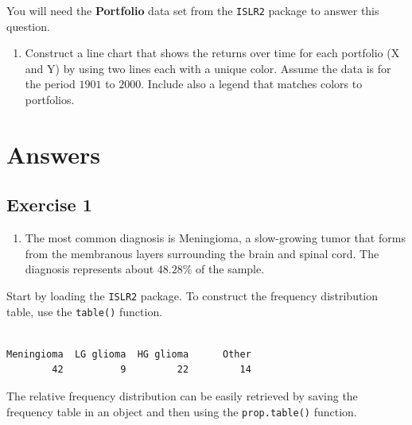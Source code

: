 \documentclass[
  letterpaper,
  DIV=11,
  numbers=noendperiod]{scrreprt}
\newenvironment{Shaded}{\begin{snugshade}}{\end{snugshade}}
\newcommand{\FunctionTok}[1]{\textcolor[rgb]{0.28,0.35,0.67}{#1}}
\newcommand{\NormalTok}[1]{\textcolor[rgb]{0.00,0.23,0.31}{#1}}
\newcommand{\SpecialCharTok}[1]{\textcolor[rgb]{0.37,0.37,0.37}{#1}}
\providecommand{\tightlist}{%
  \setlength{\itemsep}{0pt}\setlength{\parskip}{0pt}}\usepackage{longtable,booktabs,array}
\begin{document}
You will need the \textbf{Portfolio} data set from the \texttt{ISLR2}
package to answer this question.

\begin{enumerate}
\def\labelenumi{\arabic{enumi}.}
\tightlist
\item
  Construct a line chart that shows the returns over time for each
  portfolio (X and Y) by using two lines each with a unique color.
  Assume the data is for the period \(1901\) to \(2000\). Include also a
  legend that matches colors to portfolios.
\end{enumerate}

\hypertarget{answers-1}{%
\section{Answers}\label{answers-1}}

\hypertarget{exercise-1-3}{%
\subsection*{Exercise 1}\label{exercise-1-3}}

\begin{enumerate}
\def\labelenumi{\arabic{enumi}.}
\tightlist
\item
  The most common diagnosis is Meningioma, a slow-growing tumor that
  forms from the membranous layers surrounding the brain and spinal
  cord. The diagnosis represents about \(48.28\)\% of the sample.
\end{enumerate}

Start by loading the \texttt{ISLR2} package. To construct the frequency
distribution table, use the \texttt{table()} function.

\begin{Shaded}
\end{Shaded}

\begin{verbatim}

Meningioma  LG glioma  HG glioma      Other 
        42          9         22         14 
\end{verbatim}

The relative frequency distribution can be easily retrieved by saving
the frequency table in an object and then using the
\texttt{prop.table()} function.
\end{document}
